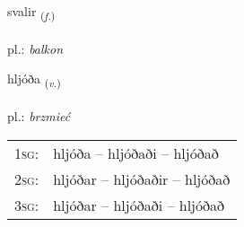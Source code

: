 \documentclass[frontgrid, backgrid]{flacards}\usepackage[]{graphicx}\usepackage[]{xcolor}
\begin{document}
\renewcommand{\flhead}{\vskip5pt \fboxsep=0pt {\small\bfseries\footnotesize Nafnorð | rzeczownik}}
\renewcommand{\fcfoot}{\vskip5pt \fboxsep=0pt \hspace{2pt}{\small\bfseries\footnotesize 3K}}

\renewcommand{\blhead}{\vskip5pt {\small\bfseries\footnotesize Nafnorð | rzeczownik }}
\renewcommand{\bcfoot}{\vskip5pt \hspace{2pt}{\small\bfseries\footnotesize 3K}}


{svalir \small{\textsubscript{(\textit{f.})}} \\[1ex] %
\textphonetic{[svaːlɪr]} \\
pl.: \emph{balkon} \\  [2ex]
\renewcommand*{\arraystretch}{0.8}
}

\renewcommand{\flhead}{\vskip5pt \fboxsep=0pt {\small\bfseries\footnotesize Sagnorð | czasownik}}
\renewcommand{\fcfoot}{\vskip5pt \fboxsep=0pt \hspace{2pt}{\small\bfseries\footnotesize 3K}}

\renewcommand{\blhead}{\vskip5pt {\small\bfseries\footnotesize Sagnorð | czasownik }}
\renewcommand{\bcfoot}{\vskip5pt \hspace{2pt}{\small\bfseries\footnotesize 3K}}


{hljóða \small{\textsubscript{(\textit{v.})}} \\[1ex] %
\textphonetic{[l̥jouːða]} \\
pl.: \emph{brzmieć} \\  [2ex]
\renewcommand*{\arraystretch}{0.8}
\begin{tabular}{p{1cm}l}
\textsc{1sg}: & hljóða -- hljóðaði -- hljóðað \\ 
\textsc{2sg}: & hljóðar -- hljóðaðir -- hljóðað \\ 
\textsc{3sg}: & hljóðar -- hljóðaði -- hljóðað \\ 
\end{tabular}
}
\end{document}
